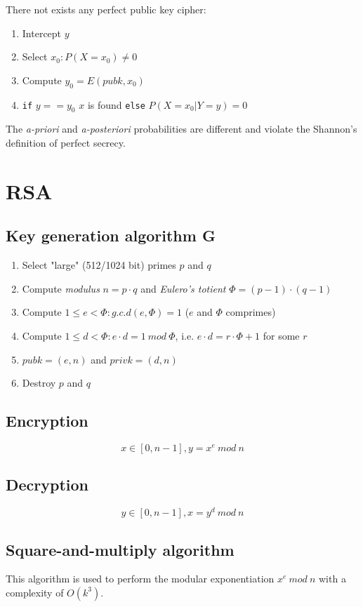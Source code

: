 \documentclass[a4paper,12pt]{article}
\begin{document}
There not exists any perfect public key cipher:
\begin{enumerate}
	\item Intercept $y$
	\item Select $x_0 : P(X = x_0) \neq 0$
	\item Compute $y_0 = E(pubk, x_0)$
	\item \texttt{if} $y == y_0$ $x$ is found \texttt{else} $P(X=x_0|Y=y) = 0$
\end{enumerate}

The \textit{a-priori} and \textit{a-posteriori} probabilities are different and violate the Shannon's definition of perfect secrecy.

\section{RSA}
\subsection{Key generation algorithm G}
\begin{enumerate}
	\item Select "large" (512/1024 bit) primes $p$ and $q$
	\item Compute \textit{modulus} $n = p \cdot q$ and \textit{Eulero's totient} $\Phi = (p-1)\cdot(q-1)$
	\item Compute $1 \leq e < \Phi : g.c.d(e, \Phi) = 1$ ($e$ and $\Phi$ comprimes)
	\item Compute $1 \leq d < \Phi : e\cdot d = 1\ mod\ \Phi$, i.e. $e\cdot d = r\cdot\Phi + 1$ for some $r$
	\item $pubk = (e,n)$ and $privk = (d,n)$
	\item Destroy $p$ and $q$
\end{enumerate}

\subsection{Encryption}
$$ x \in [0, n-1], y = x^e\ mod\ n$$

\subsection{Decryption}
$$ y \in [0, n-1], x = y^d\ mod\ n$$

\subsection{Square-and-multiply algorithm}
This algorithm is used to perform the modular exponentiation $x^e\ mod\ n$ with a complexity of $O(k^3)$.
\end{document}
